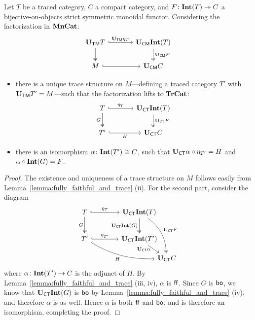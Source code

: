\documentclass[11pt,oneside,article]{memoir}
\begin{document}
\begin{lemma}\label{lem:Tr_bo_Int}
   Let $T$ be a traced category, $C$ a compact category, and $F\colon\mathbf{Int}(T)\twoheadrightarrow C$ a
   bijective-on-objects strict symmetric monoidal functor. Considering the factorization in
   $\mathbf{MnCat}$:
   \begin{equation*}
      \begin{tikzcd}[column sep=large]
         \UTM T \ar[r,hook,"\UTM\eta_{T}"] \ar[d,two heads]
            & \UCM\Int(T) \ar[d,two heads,"\UCM F"] \\
         M \ar[r,hook] & \UCM C
      \end{tikzcd}
   \end{equation*}
   \begin{itemize}
      \item there is a unique trace structure on $M$---defining a traced category $T'$ with $\mathbf{U}_{\mathsf{TM}}
         T'=M$---such that the factorization lifts to $\mathbf{TrCat}$:
         \begin{equation*}
            \begin{tikzcd}[column sep=large]
               T \ar[r,hook,"\eta_{T}"] \ar[d,two heads,"G"']
                  & \UCT\Int(T) \ar[d,two heads,"\UCT F"] \\
               T' \ar[r,hook,"H"'] & \UCT C
            \end{tikzcd}
         \end{equation*}
      \item there is an isomorphism $\alpha\colon\mathbf{Int}(T')\cong C$, such that $\mathbf{U}_{\mathsf{CT}}\alpha\circ
         \eta_{T'}=H$ and $\alpha\circ\mathbf{Int}(G)=F$.
   \end{itemize}
\end{lemma}
\begin{proof}
   The existence and uniqueness of a trace structure on $M$ follows easily from Lemma~\ref{lemma:fully_faithful_and_trace} (ii).
   For the second part, consider the diagram
   \begin{equation*}
      \begin{tikzcd}[column sep=4em, row sep=5ex]
         T \ar[r,hook,"\eta_{T}"] \ar[d,two heads,"G"']
            & \UCT\Int(T) \ar[d,two heads,"\UCT\Int(G)"']
               \ar[ddr,two heads,bend left=25,"\UCT F"] &[between origins] \\
         T' \ar[r,hook,"\eta_{T'}"] \ar[drr,hook,bend right=15,"H"']
            & \UCT\Int(T') \ar[dr,"\UCT\alpha"' {inner sep=0pt,pos=.25}] & \\[-10]
         &&\UCT C
      \end{tikzcd}
   \end{equation*}
   where $\alpha\colon\mathbf{Int}(T')\to C$ is the adjunct of $H$. By
   Lemma~\ref{lemma:fully_faithful_and_trace} (iii, iv), $\alpha$ is $\mathsf{ff}$. Since $G$ is $\mathsf{bo}$, we
   know that $\mathbf{U}_{\mathsf{CT}}\mathbf{Int}(G)$ is $\mathsf{bo}$ by Lemma~\ref{lemma:fully_faithful_and_trace} (iv), and
   therefore $\alpha$ is as well. Hence $\alpha$ is both $\mathsf{ff}$ and $\mathsf{bo}$, and is therefore an
   isomorphism, completing the proof.
\end{proof}
\end{document}
